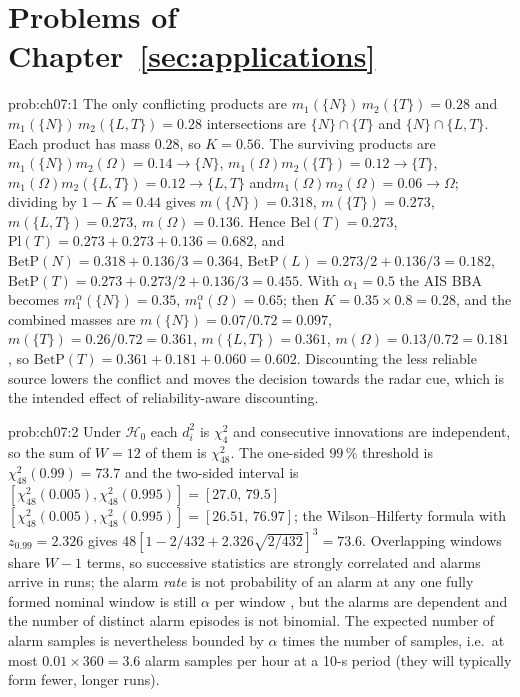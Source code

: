 \documentclass[graybox,envcountchap]{style/SNmono}
\providecommand{\DIFadd}[1]{{\protect\color{blue} #1}} %
\providecommand{\DIFdel}[1]{{\protect\color{red} #1}} %
\providecommand{\DIFaddbegin}{} %
\providecommand{\DIFaddend}{} %
\providecommand{\DIFdelbegin}{} %
\providecommand{\DIFdelend}{} %
\begin{document}
\section*{Problems of Chapter~\ref{sec:applications}}

\begin{sol}{prob:ch07:1}
The only conflicting \DIFdelbegin \DIFdel{products are $m_1(\{N\})\,m_2(\{T\})=0.28$ and $m_1(\{N\})\,m_2(\{L,T\})=0.28$}\DIFdelend \DIFaddbegin \DIFadd{intersections are $\{N\}\cap\{T\}$ and $\{N\}\cap\{L,T\}$. Each product has mass $0.28$}\DIFaddend , so $K=0.56$. The surviving products are $m_1(\{N\})m_2(\Omega)=0.14\to\{N\}$, $m_1(\Omega)m_2(\{T\})=0.12\to\{T\}$, $m_1(\Omega)m_2(\{L,T\})=0.12\to\{L,T\}$ and\DIFaddbegin \allowbreak \DIFaddend $m_1(\Omega)m_2(\Omega)=0.06\to\Omega$; dividing by $1-K=0.44$ gives $m(\{N\})=0.318$, $m(\{T\})=0.273$, $m(\{L,T\})=0.273$, $m(\Omega)=0.136$. Hence $\mathrm{Bel}(T)=0.273$, $\mathrm{Pl}(T)=0.273+0.273+0.136=0.682$, and $\mathrm{BetP}(N)=0.318+0.136/3=0.364$, $\mathrm{BetP}(L)=0.273/2+0.136/3=0.182$, $\mathrm{BetP}(T)=0.273+0.273/2+0.136/3=0.455$. With $\alpha_1=0.5$ the AIS BBA becomes $m_1^{\alpha}(\{N\})=0.35$, $m_1^{\alpha}(\Omega)=0.65$; then $K=0.35\times0.8=0.28$, and the combined masses are $m(\{N\})=0.07/0.72=0.097$, $m(\{T\})=0.26/0.72=0.361$, $m(\{L,T\})=0.361$, $m(\Omega)=0.13/0.72=0.181$, so $\mathrm{BetP}(T)=0.361+0.181+0.060=0.602$. Discounting the less reliable source lowers the conflict and moves the decision towards the radar cue, which is the intended effect of reliability-aware discounting.
\end{sol}
\begin{sol}{prob:ch07:2}
Under $\mathcal{H}_0$ each $d_i^{2}$ is $\chi^{2}_{4}$ and consecutive innovations are independent, so the sum of $W=12$ of them is $\chi^{2}_{48}$. The one-sided $99\,\%$ threshold is $\chi^{2}_{48}(0.99)=73.7$ and the two-sided interval is \DIFdelbegin \DIFdel{$[\chi^{2}_{48}(0.005),\chi^{2}_{48}(0.995)]=[27.0,\,79.5]$}\DIFdelend \DIFaddbegin \DIFadd{$[\chi^{2}_{48}(0.005),\chi^{2}_{48}(0.995)]=[26.51,\,76.97]$}\DIFaddend ; the Wilson--Hilferty formula with $z_{0.99}=2.326$ gives $48[1-2/432+2.326\sqrt{2/432}]^{3}=73.6$. Overlapping windows share $W-1$ terms, so successive statistics are strongly correlated and alarms arrive in runs; the \DIFdelbegin \DIFdel{alarm }\emph{\DIFdel{rate}} %
\DIFdel{is not }\DIFdelend \DIFaddbegin \DIFadd{probability of an alarm at any one fully formed nominal window is still }\DIFaddend $\alpha$\DIFdelbegin \DIFdel{per window}\DIFdelend \DIFaddbegin \DIFadd{, but the alarms are dependent and the number of distinct alarm episodes is not binomial}\DIFaddend . The expected number of alarm samples is nevertheless bounded by $\alpha$ times the number of samples, i.e.\ at most $0.01\times360=3.6$ alarm samples per hour at a 10-s period (they will typically form fewer, longer runs).
\end{sol}
\end{document}

